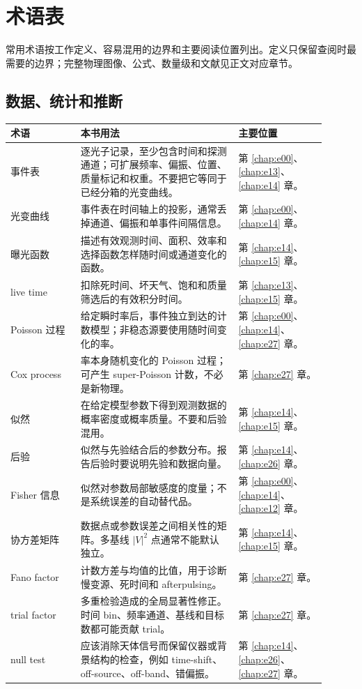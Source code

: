 \chapter{术语表}
\label{app:c}

常用术语按工作定义、容易混用的边界和主要阅读位置列出。定义只保留查阅时最需要的边界；完整物理图像、公式、数量级和文献见正文对应章节。

\section{数据、统计和推断}
\label{appsec:c-data}

\begin{longtable}{p{0.20\linewidth}p{0.45\linewidth}p{0.25\linewidth}}
\toprule
术语 & 本书用法 & 主要位置 \\
\midrule
事件表 & 逐光子记录，至少包含时间和探测通道；可扩展频率、偏振、位置、质量标记和权重。不要把它等同于已经分箱的光变曲线。 & 第 \ref{chap:e00}、\ref{chap:e13}、\ref{chap:e14} 章。 \\
光变曲线 & 事件表在时间轴上的投影，通常丢掉通道、偏振和单事件间隔信息。 & 第 \ref{chap:e00}、\ref{chap:e14} 章。 \\
曝光函数 & 描述有效观测时间、面积、效率和选择函数怎样随时间或通道变化的函数。 & 第 \ref{chap:e14}、\ref{chap:e15} 章。 \\
live time & 扣除死时间、坏天气、饱和和质量筛选后的有效积分时间。 & 第 \ref{chap:e13}、\ref{chap:e15} 章。 \\
Poisson 过程 & 给定瞬时率后，事件独立到达的计数模型；非稳态源要使用随时间变化的率。 & 第 \ref{chap:e00}、\ref{chap:e14}、\ref{chap:e27} 章。 \\
Cox process & 率本身随机变化的 Poisson 过程；可产生 super-Poisson 计数，不必是新物理。 & 第 \ref{chap:e27} 章。 \\
似然 & 在给定模型参数下得到观测数据的概率密度或概率质量。不要和后验混用。 & 第 \ref{chap:e14}、\ref{chap:e15} 章。 \\
后验 & 似然与先验结合后的参数分布。报告后验时要说明先验和数据向量。 & 第 \ref{chap:e14}、\ref{chap:e26} 章。 \\
Fisher 信息 & 似然对参数局部敏感度的度量；不是系统误差的自动替代品。 & 第 \ref{chap:e00}、\ref{chap:e14}、\ref{chap:e12} 章。 \\
协方差矩阵 & 数据点或参数误差之间相关性的矩阵。多基线 \(|V|^2\) 点通常不能默认独立。 & 第 \ref{chap:e14}、\ref{chap:e15} 章。 \\
Fano factor & 计数方差与均值的比值，用于诊断慢变源、死时间和 afterpulsing。 & 第 \ref{chap:e27} 章。 \\
trial factor & 多重检验造成的全局显著性修正。时间 bin、频率通道、基线和目标数都可能贡献 trial。 & 第 \ref{chap:e27} 章。 \\
null test & 应该消除天体信号而保留仪器或背景结构的检查，例如 time-shift、off-source、off-band、错偏振。 & 第 \ref{chap:e14}、\ref{chap:e26}、\ref{chap:e27} 章。 \\
\bottomrule
\end{longtable}

